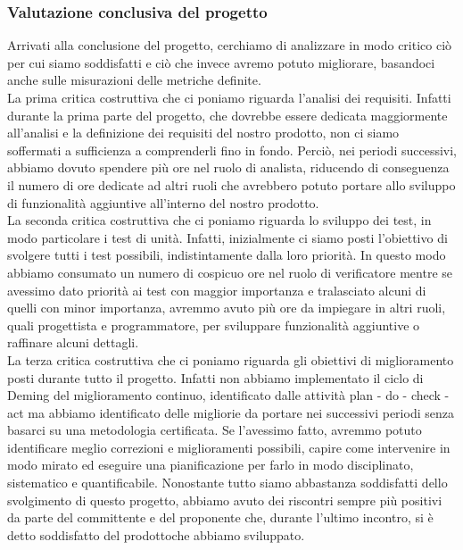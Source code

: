 		\subsubsection{Valutazione conclusiva del progetto}
		Arrivati alla conclusione del progetto, cerchiamo di analizzare in modo critico ciò per cui siamo soddisfatti e ciò che invece avremo potuto migliorare, basandoci anche sulle misurazioni delle metriche definite. \\
		La prima critica costruttiva che ci poniamo riguarda l'analisi dei requisiti. Infatti durante la prima parte del progetto\glo, che dovrebbe essere dedicata maggiormente all'analisi e la definizione dei requisiti del nostro prodotto\glo, non ci siamo soffermati a sufficienza a comprenderli fino in fondo. Perciò, nei periodi successivi, abbiamo dovuto spendere più ore nel ruolo di analista, riducendo di conseguenza il numero di ore dedicate ad altri ruoli che avrebbero potuto portare allo sviluppo di funzionalità aggiuntive all'interno del nostro prodotto\glo. \\
		La seconda critica costruttiva che ci poniamo riguarda lo sviluppo dei test, in modo particolare i test di unità. Infatti, inizialmente ci siamo posti l'obiettivo di svolgere tutti i test possibili, indistintamente dalla loro priorità. In questo modo abbiamo consumato un numero di cospicuo ore nel ruolo di verificatore mentre se avessimo dato priorità ai test con maggior importanza e tralasciato alcuni di quelli con minor importanza, avremmo avuto più ore da impiegare in altri ruoli, quali progettista e programmatore, per sviluppare funzionalità aggiuntive o raffinare alcuni dettagli. \\
		La terza critica costruttiva che ci poniamo riguarda gli obiettivi di miglioramento posti durante tutto il progetto\glo. Infatti non abbiamo implementato il ciclo di Deming del miglioramento continuo, identificato dalle attività plan - do - check - act ma abbiamo identificato delle migliorie da portare nei successivi periodi senza basarci su una metodologia certificata. Se l'avessimo fatto, avremmo potuto identificare meglio correzioni e miglioramenti possibili, capire come intervenire in modo mirato ed eseguire una pianificazione per farlo in modo disciplinato, sistematico e quantificabile.
		Nonostante tutto siamo abbastanza soddisfatti dello svolgimento di questo progetto\glo, abbiamo avuto dei riscontri sempre più positivi da parte del committente e del proponente che, durante l'ultimo incontro, si è detto soddisfatto del prodotto\glosp che abbiamo sviluppato.
		
		